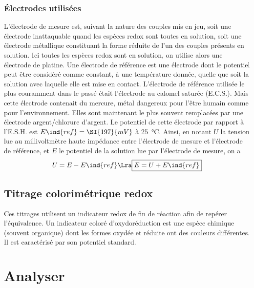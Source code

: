 \documentclass[../main/main.tex]{subfiles}
\begin{document}
{	\subsubsection{Électrodes utilisées}
	L'électrode de mesure est, suivant la nature des couples mis en jeu, soit une
	électrode inattaquable quand les espèces redox sont toutes en solution, soit
	une électrode métallique constituant la forme réduite de l'un des couples
	présents en solution. Ici toutes les espèces redox sont en solution, on
	utilise alors une électrode de platine.
	\bigbreak
	Une électrode de référence est une électrode dont le potentiel peut être
	considéré comme constant, à une température donnée, quelle que soit la
	solution avec laquelle elle est mise en contact. L'électrode de référence
	utilisée le plus couramment dans le passé était l'électrode au calomel saturée
	(E.C.S.). Mais cette électrode contenait du mercure, métal dangereux pour
	l'être humain comme pour l'environnement. Elles sont maintenant le plus
	souvent remplacées par une électrode argent/chlorure d'argent.
	\bigbreak
	Le potentiel de cette électrode par rapport à l'E.S.H. est $E\ind{ref} =
		\SI{197}{mV}$ à \SI{25}{\degreeCelsius}. Ainsi, en notant $U$ la tension lue
	au millivoltmètre haute impédance entre l'électrode de mesure et l'électrode
	de référence, et $E$ le potentiel de la solution lue par l'électrode de
	mesure, on a
	\[
		U = E - E\ind{ref}
		\Lra
		\boxed{E = U + E\ind{ref}}
	\]

	\subsection{Titrage colorimétrique redox}
	Ces titrages utilisent un indicateur redox de fin de réaction afin de repérer
	l'équivalence. Un indicateur coloré d'oxydoréduction est une espèce chimique
	(souvent organique) dont les formes oxydée et réduite ont des couleurs
	différentes. Il est caractérisé par son potentiel standard.
}%

\setcounter{section}{2}
\section{Analyser}
\end{document}
